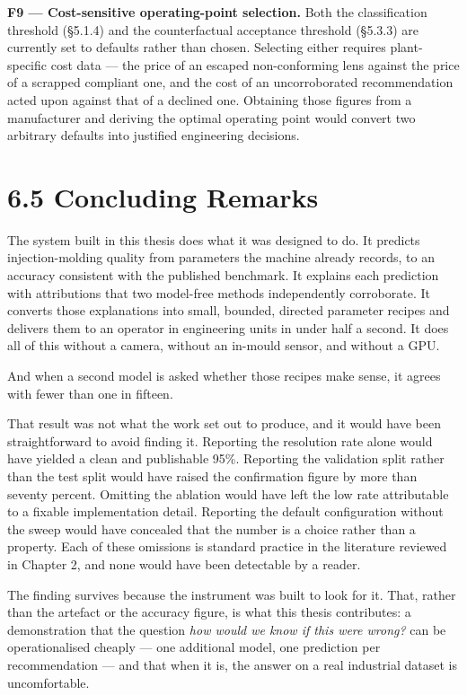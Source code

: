 \textbf{F9 --- Cost-sensitive operating-point selection.} Both the classification threshold (§5.1.4) and the counterfactual acceptance threshold (§5.3.3) are currently set to defaults rather than chosen. Selecting either requires plant-specific cost data --- the price of an escaped non-conforming lens against the price of a scrapped compliant one, and the cost of an uncorroborated recommendation acted upon against that of a declined one. Obtaining those figures from a manufacturer and deriving the optimal operating point would convert two arbitrary defaults into justified engineering decisions.

\hypertarget{concluding-remarks}{%
\section{6.5 Concluding Remarks}\label{concluding-remarks}}

The system built in this thesis does what it was designed to do. It predicts injection-molding quality from parameters the machine already records, to an accuracy consistent with the published benchmark. It explains each prediction with attributions that two model-free methods independently corroborate. It converts those explanations into small, bounded, directed parameter recipes and delivers them to an operator in engineering units in under half a second. It does all of this without a camera, without an in-mould sensor, and without a GPU.

And when a second model is asked whether those recipes make sense, it agrees with fewer than one in fifteen.

That result was not what the work set out to produce, and it would have been straightforward to avoid finding it. Reporting the resolution rate alone would have yielded a clean and publishable 95\%. Reporting the validation split rather than the test split would have raised the confirmation figure by more than seventy percent. Omitting the ablation would have left the low rate attributable to a fixable implementation detail. Reporting the default configuration without the sweep would have concealed that the number is a choice rather than a property. Each of these omissions is standard practice in the literature reviewed in Chapter 2, and none would have been detectable by a reader.

The finding survives because the instrument was built to look for it. That, rather than the artefact or the accuracy figure, is what this thesis contributes: a demonstration that the question \emph{how would we know if this were wrong?} can be operationalised cheaply --- one additional model, one prediction per recommendation --- and that when it is, the answer on a real industrial dataset is uncomfortable.

